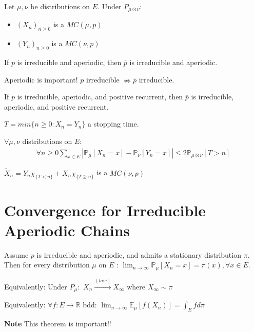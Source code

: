 \begin{prop}[]
	Let $\mu,\nu $ be distributions on $E$. Under $P_{\mu \otimes \nu }:$ 
\begin{itemize}
	\item $(X_n)_{n\geq 0}$ is a $MC(\mu ,p)$ 
	\item $(Y_n)_{n\geq 0}$ is a $MC(\nu ,p)$
\end{itemize}

\end{prop}

\begin{prop}[]
	If $p$ is irreducible and aperiodic, then $\overline{p}$ is irreducible and aperiodic.
\end{prop}

\begin{rmk}[]
	Aperiodic is important!  $p$ irreducible $\nRightarrow \overline{p}$ irreducible.
\end{rmk}

\begin{prop}[]
	If $p$ is irreducible, aperiodic, and positive recurrent, then $\overline{p}$ is irreducible, aperiodic, and positive recurrent.
\end{prop}

\begin{defn}
	$T=min\{n\geq 0: X_n=Y_n\}$ a stopping time.
\end{defn}

\begin{prop}[]
	$\forall \mu, \nu $ distributions on $E $: 
\begin{align}
\forall n\geq 0 \sum_{x \in E}^{} |\mathbb{P}_{\mu } \left[ X_n=x \right] - \mathbb{P}_{\nu} \left[Y_n=x  \right] | \leq 2 \mathbb{P}_{\mu \otimes \nu } \left[ T>n \right]
\end{align}
\end{prop}

\begin{lemma}[]
	$\tilde{X}_n = Y_n\chi_{\{T<n\}} + X_n \chi_{\{T \geq n\}} $ is a $MC(\nu, p)$
\end{lemma}

\section{Convergence for Irreducible Aperiodic Chains}
\begin{theorem}[]
	Assume $p$ is irreducible and aperiodic, and admits a stationary distribution $\pi $. Then for every distribution $\mu$ on $E$ : $\lim_{n \to \infty}\mathbb{P}_{\mu } \left[ X_n=x \right] = \pi(x), \forall x \in E$. 

	\noindent
	Equivalently: Under $P_\mu: $ $X_n \stackrel{(law)}{\to} X_\infty$ where $X_\infty \sim \pi$ 

	\noindent
	Equivalently: $\forall f:E \to \mathbb{R}$ bdd: $\lim_{n \to \infty} \mathbb{E}_{\mu } \left[ f(X_n) \right] = \int_{E}^{} f d \pi$
\end{theorem}
\textbf{Note} This theorem is important!! 

